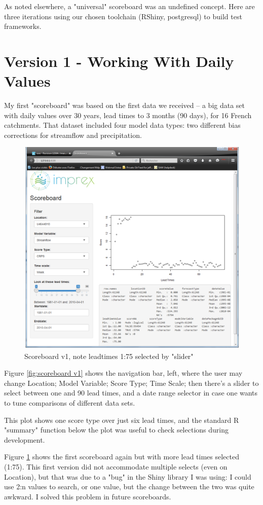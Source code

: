 \documentclass[logos,parttoc,morelanguage=french,morelanguage=german,draft]{orsay-memoire}
\begin{document}
As noted elsewhere, a "universal" scoreboard was an undefined concept. Here are three iterations using our chosen toolchain (RShiny, postgresql) to build test frameworks.

\section{Version 1 - Working With Daily Values}
My first "scoreboard" was based on the first data we received -- a big data set with daily values over 30 years, lead times to 3 months (90 days), for 16 French catchments. That dataset included four model data types: two different bias corrections for streamflow and precipitation.

\begin{figure}[!ht]
\centering
\includegraphics[width=0.8\linewidth]{images/sbdV1v21notes2.png}
  \caption{Scoreboard v1, note leadtimes 1:75 selected by "slider"}
  \label{fig:scoreboard v1.2}
\end{figure}

Figure \ref{fig:scoreboard v1} shows the navigation bar, left, where the user may change Location; Model Variable; Score Type; Time Scale; then there's a slider to select between one and 90 lead times, and a date range selector in case one wants to tune comparisons of different data sets. 

This plot shows one score type over just six lead times, and the standard R "summary" function below the plot was useful to check selections during development.

Figure \ref{fig:scoreboard v1.2} shows the first scoreboard again but with more lead times selected (1:75). This first version did not accommodate multiple selects (even on Location), but that was due to a "bug" in the Shiny library I was using: I could use 2:n values to search, or one value, but the change between the two was quite awkward. I solved this problem in future scoreboards.
\end{document}
